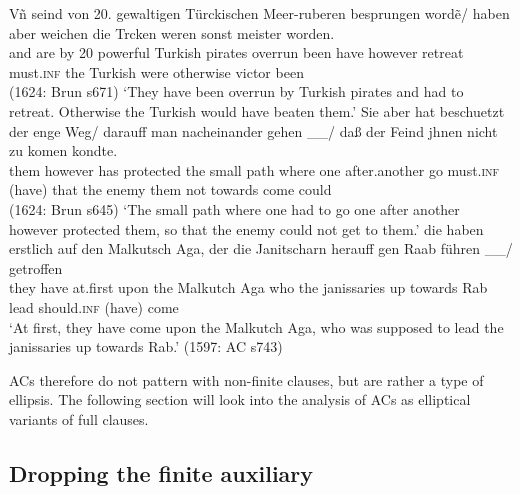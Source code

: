 \documentclass[output=paper,colorlinks,citecolor=brown]{langscibook}
\begin{document}
\eal 
\ex \label{ersatzinfinitiv_a}
\gll Vñ seind von 20. gewaltigen Türckischen Meer-r\oldae{}uberen besprungen wordẽ/ haben aber weichen  die T\oldue{}rcken weren sonst meister worden.\\ and are by 20 powerful Turkish pirates overrun been have however retreat must.\textsc{inf} the Turkish were otherwise victor been \\ \hfill (1624: Brun s671)
\glt `They have been overrun by Turkish pirates and had to retreat. Otherwise the Turkish would have beaten them.'
\ex \label{ersatzinfinitiv_b}
\gll Sie aber hat beschuetzt der enge Weg/ darauff man nacheinander gehen  \_\_/ daß der Feind jhnen nicht zu komen kondte. \\ them however has protected the small path where one after.another go must.\textsc{inf} (have) that the enemy them not towards come could  \\ \hfill (1624: Brun s645)
\glt `The small path where one had to go one after another however protected them, so that the enemy could not get to them.'
\ex \label{ersatzinfinitiv_c}
\gll die haben erstlich auf den Malkutsch Aga, der die Janitscharn herauff gen Raab führen
 \_\_/ getroffen \\ they have at.first upon the Malkutch Aga who the janissaries up towards Rab lead should.\textsc{inf} (have) come \\ 
\glt `At first, they have come upon the Malkutch Aga, who was supposed to lead the janissaries up towards Rab.' \hfill (1597: AC s743)
\zl

\noindent
ACs therefore do not pattern with non-finite clauses, but are rather a type of ellipsis. The following section will look into the analysis of ACs as elliptical variants of full clauses.
 
\subsection{Dropping the finite auxiliary \label{finiteness}}
\end{document}
